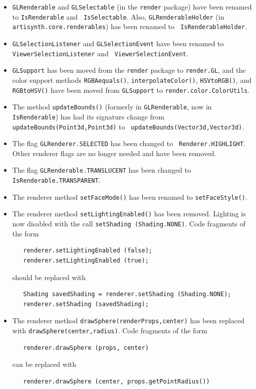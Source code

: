 \documentclass{article}
\begin{document}
\begin{itemize}

\item {\tt GLRenderable} and {\tt GLSelectable} (in the {\tt render} package)
have been renamed to {\tt IsRenderable} and {\tt
IsSelectable}.  Also, {\tt GLRenderableHolder} (in {\tt
artisynth.core.renderables}) has been renamed to {\tt
IsRenderableHolder}.

\item {\tt GLSelectionListener} and {\tt GLSelectionEvent} have been
renamed to {\tt ViewerSelectionListener} and {\tt
ViewerSelectionEvent}.

\item {\tt GLSupport} has been moved from the {\tt render} package to
{\tt render.GL}, and the color support methods {\tt RGBAequals()},
{\tt interpolateColor()}, {\tt HSVtoRGB()}, and {\tt RGBtoHSV()} have
been moved from {\tt GLSupport} to {\tt render.color.ColorUtils}.

\item The method {\tt updateBounds()} (formerly in {\tt GLRenderable},
now in {\tt IsRenderable}) has had its signature change from {\tt
updateBounds(Point3d,Point3d)} to {\tt
updateBounds(Vector3d,Vector3d)}.

\item The flag {\tt GLRenderer.SELECTED} has been changed to {\tt
Renderer.HIGHLIGHT}. Other renderer flags are no longer needed and
have been removed.

\item The flag {\tt GLRenderable.TRANSLUCENT} has been changed to {\tt
IsRenderable.TRANSPARENT}.

\item The renderer method {\tt setFaceMode()} has been renamed to
{\tt setFaceStyle()}.

\item The renderer method {\tt setLightingEnabled()} has been
removed. Lighting is now disabled with the call {\tt setShading
(Shading.NONE)}. Code fragments of the form
\begin{verbatim}
   renderer.setLightingEnabled (false);
   renderer.setLightingEnabled (true);
\end{verbatim}
should be replaced with
\begin{verbatim}
   Shading savedShading = renderer.setShading (Shading.NONE);
   renderer.setShading (savedShading);
\end{verbatim}

\item The renderer method 
{\tt drawSphere(renderProps,center)}
has been replaced with
{\tt drawSphere(center,radius)}.
Code fragments of the form
\begin{verbatim}
   renderer.drawSphere (props, center)
\end{verbatim}
can be replaced with
\begin{verbatim}
   renderer.drawSphere (center, props.getPointRadius())
\end{verbatim}


\end{itemize}
\end{document}
